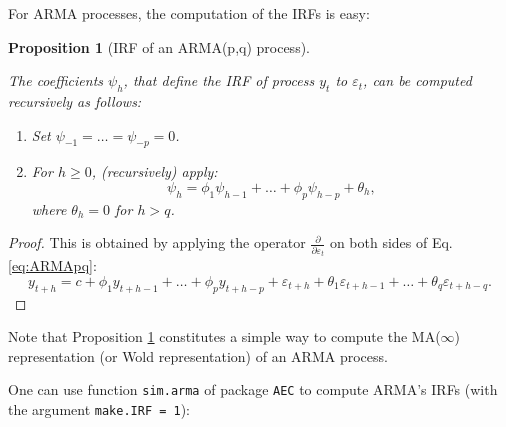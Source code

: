 \documentclass[
  12pt,
]{book}
\providecommand{\tightlist}{%
  \setlength{\itemsep}{0pt}\setlength{\parskip}{0pt}}
\newtheorem{proposition}{Proposition}[chapter]
\theoremstyle{definition}
\theoremstyle{definition}
\theoremstyle{definition}
\theoremstyle{definition}
\theoremstyle{remark}
\begin{document}
For ARMA processes, the computation of the IRFs is easy:

\begin{proposition}[IRF of an ARMA(p,q) process]
\protect\hypertarget{prp:computPsi}{}\label{prp:computPsi}

The coefficients \(\psi_h\), that define the IRF of process \(y_t\) to \(\varepsilon_t\), can be computed recursively as follows:

\begin{enumerate}
\def\labelenumi{\arabic{enumi}.}
\tightlist
\item
  Set \(\psi_{-1}=\dots=\psi_{-p}=0\).
\item
  For \(h \ge 0\), (recursively) apply:
  \[
  \psi_h = \phi_1 \psi_{h-1} + \dots + \phi_p \psi_{h-p} + \theta_h,
  \]
  where \(\theta_h = 0\) for \(h>q\).
\end{enumerate}

\end{proposition}

\begin{proof}
This is obtained by applying the operator \(\frac{\partial}{\partial \varepsilon_{t}}\) on both sides of Eq. \eqref{eq:ARMApq}:
\[
y_{t+h} = c + \phi_1 y_{t+h-1} + \dots + \phi_p y_{t+h-p} + \varepsilon_{t+h} + \theta_1 \varepsilon_{t+h-1} + \dots + \theta_q \varepsilon_{t+h-q}.
\]
\end{proof}

Note that Proposition \ref{prp:computPsi} constitutes a simple way to compute the MA(\(\infty\)) representation (or Wold representation) of an ARMA process.

One can use function \texttt{sim.arma} of package \texttt{AEC} to compute ARMA's IRFs (with the argument \texttt{make.IRF\ =\ 1}):
\end{document}
